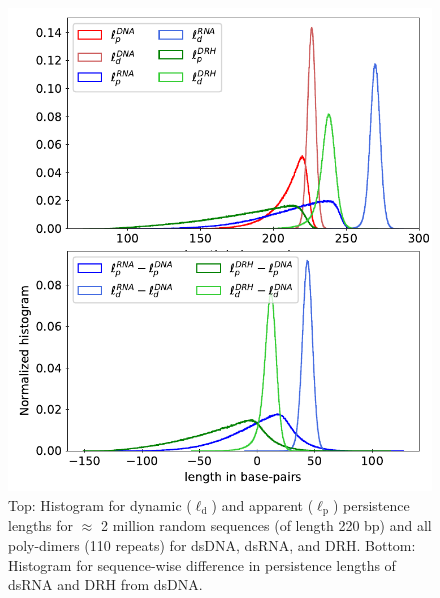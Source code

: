 \begin{figure}[H]
\begin{center}
\centering\includegraphics[scale=0.71]{images/persistence_length.pdf}
\end{center}
\vspace{-0.5cm}
\centering\caption{
Top: Histogram for dynamic ($\ell_\text{d}$) and apparent ($\ell_\text{p}$) persistence lengths for $\approx$ 2 million random sequences (of length 220 bp) and all poly-dimers (110 repeats) for dsDNA, dsRNA, and DRH. Bottom: Histogram for sequence-wise difference in persistence lengths of dsRNA and DRH from dsDNA.
}
\label{c4:fig6_persis}
\end{figure}
\vspace{-0.5cm}
